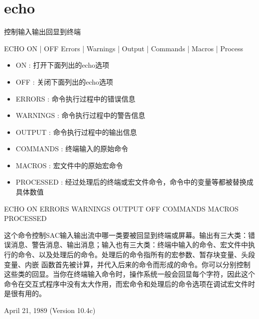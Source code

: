 \section{echo}
\label{cmd:echo}
控制输入输出回显到终端

ECHO ON | OFF Errors | Warnings | Output | Commands | Macros | Process

\begin{itemize}
\item ON : 打开下面列出的echo选项
\item OFF : 关闭下面列出的echo选项 
\item ERRORS : 命令执行过程中的错误信息 
\item WARNINGS : 命令执行过程中的警告信息 
\item OUTPUT : 命令执行过程中的输出信息  
\item COMMANDS : 终端输入的原始命令 
\item MACROS : 宏文件中的原始宏命令 
\item PROCESSED : 经过处理后的终端或宏文件命令，命令中的变量等都被替换成具体数值
\end{itemize}

ECHO ON ERRORS WARNINGS OUTPUT OFF COMMANDS MACROS PROCESSED

这个命令控制SAC输入输出流中哪一类要被回显到终端或屏幕。输出有三大类：错误消息、警告消息、输出消息；输入也有三大类：终端中输入的命令、宏文件中执行的命令、以及处理后的命令。处理后的命令指所有的宏参数、暂存块变量、头段变量、内嵌	函数首先被计算，并代入后来的命令而形成的命令。你可以分别控制这些类的回显。当你在终端输入命令时，操作系统一般会回显每个字符，因此这个命令在交互式程序中没有太大作用，而宏命令和处理后的命令选项在调试宏文件时是很有用的。

April 21, 1989 (Version 10.4c)
